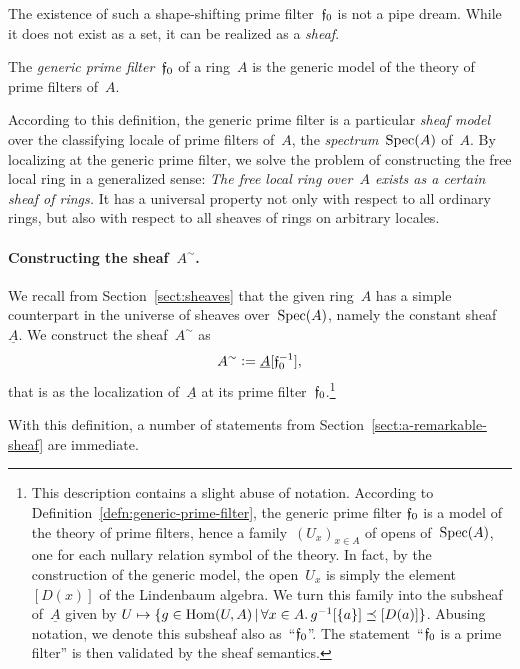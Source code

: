 \documentclass{ws-rv9x6}
\begin{document}
{The existence of such a shape-shifting prime filter~$\mathfrak{f}_0$ is not a pipe dream.
While it does not exist as a set, it can be realized as a \emph{sheaf}.

\begin{definition}\label{defn:generic-prime-filter}
The \emph{generic prime filter}~$\mathfrak{f}_0$ of a ring~$A$ is the
generic model of the theory of prime filters of~$A$.\end{definition}

According to this definition, the generic prime filter is a particular
\emph{sheaf model} over the classifying locale of prime filters of~$A$, the
\emph{spectrum}~$\mathrm{Spec}(A)$ of~$A$. By localizing at the generic prime filter, we solve
the problem of constructing the free local ring in a generalized sense: \emph{The
free local ring over~$A$ exists as a certain sheaf of rings.} It has a
universal property not only with respect to all ordinary rings, but also with respect to all
sheaves of rings on arbitrary locales.

\paragraph{Constructing the sheaf~$A^\sim$.} We recall from Section~\ref{sect:sheaves} that the given ring~$A$
has a simple counterpart in the universe of sheaves over~$\mathrm{Spec}(A)$, namely the
constant sheaf~$\underline{A}$. We construct the sheaf~$A^\sim$ as
\[ A^\sim \vcentcolon= \underline{A}[\mathfrak{f}_0^{-1}], \]
that is as the localization of~$\underline{A}$ at its prime
filter~$\mathfrak{f}_0$.\footnote{This description contains a slight abuse of notation.
According to Definition~\ref{defn:generic-prime-filter}, the generic prime
filter $\mathfrak{f}_0$ is a model of the theory of prime filters, hence a
family~$(U_x)_{x \in A}$ of opens of~$\mathrm{Spec}(A)$, one for each nullary relation
symbol of the theory. In fact, by the construction of the generic model, the
open~$U_x$ is simply the element~$[D(x)]$ of the Lindenbaum algebra. We
turn this family into the subsheaf of~$\underline{A}$ given by $U \mapsto \{ g
\in \mathrm{Hom}(U,A) \,|\, \forall x \in A\mathpunct{.} g^{-1}[\{a\}] \preceq [D(a)] \}$. Abusing
notation, we denote this subsheaf also as~``$\mathfrak{f}_0$''. The
statement~``$\mathfrak{f}_0$ is a prime filter'' is then validated by the sheaf semantics.}

With this definition, a number of statements from
Section~\ref{sect:a-remarkable-sheaf} are immediate.

}
\end{document}
